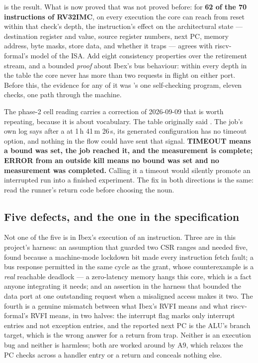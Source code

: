  is the result. What is now proved that was not
proved before: for \textbf{62 of the 70 instructions of RV32IMC}, on
every execution the core can reach from reset within that check's depth,
the instruction's effect on the architectural state --- destination
register and value, source register numbers, next PC, memory address,
byte masks, store data, and whether it traps --- agrees with
riscv-formal's model of the ISA. Add eight consistency properties over
the retirement stream, and a bounded \emph{proof} about Ibex's bus
behaviour: within every depth in the table the core never has more than
two requests in flight on either port. Before this, the evidence for any
of it was 's one self-checking program, eleven
checks, one path through the machine.

The phase-2 cell reading  carries a correction of 2026-09-09
that is worth repeating, because it is about vocabulary. The table
originally said . The job's own log says
 after a  at 1\,h 41\,m 26\,s,
its generated configuration has no timeout option, and nothing in the
flow could have sent that signal. \textbf{TIMEOUT means a bound was set,
the job reached it, and the measurement is complete; ERROR from an
outside kill means no bound was set and no measurement was completed.}
Calling it a timeout would silently promote an interrupted run into a
finished experiment. The fix in both directions is the same: read the
runner's return code before choosing the noun.

\subsection{Five defects, and the one in the specification}
\label{sec:verif-rvf-defects}

Not one of the five is in Ibex's execution of an instruction. Three are
in this project's harness: an assumption that guarded two CSR ranges and
needed five, found because a machine-mode lockdown bit made every
instruction fetch fault; a bus response permitted in the same cycle as
the grant, whose counterexample is a \emph{real} reachable deadlock ---
a zero-latency memory hangs this core, which is a fact anyone
integrating it needs; and an assertion in the harness that bounded the
data port at one outstanding request when a misaligned access makes it
two. The fourth is a genuine mismatch between what Ibex's RVFI means and
what riscv-formal's RVFI means, in two halves: the interrupt flag marks
only interrupt entries and not exception entries, and the reported next
PC is the ALU's branch target, which is the wrong answer for a return
from trap. Neither is an execution bug and neither is harmless; both are
worked around by A9, which relaxes the PC checks across a handler entry
or a return and conceals nothing else.

